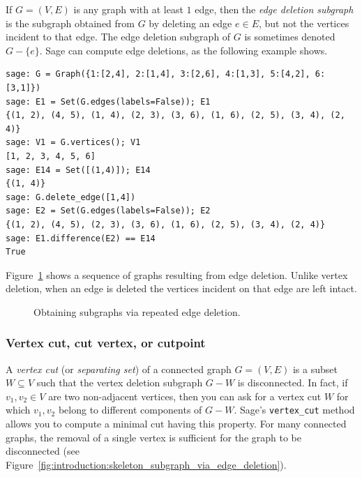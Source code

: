 If $G = (V,E)$ is any graph with at least $1$ edge, then the
\emph{edge deletion subgraph} is the subgraph obtained from $G$ by
deleting an edge $e \in E$, but not the vertices incident to that edge.
The edge deletion subgraph of $G$ is sometimes denoted $G - \{e\}$.
Sage can compute edge deletions, as the following example shows.
%
\begin{lstlisting}
sage: G = Graph({1:[2,4], 2:[1,4], 3:[2,6], 4:[1,3], 5:[4,2], 6:[3,1]})
sage: E1 = Set(G.edges(labels=False)); E1
{(1, 2), (4, 5), (1, 4), (2, 3), (3, 6), (1, 6), (2, 5), (3, 4), (2, 4)}
sage: V1 = G.vertices(); V1
[1, 2, 3, 4, 5, 6]
sage: E14 = Set([(1,4)]); E14
{(1, 4)}
sage: G.delete_edge([1,4])
sage: E2 = Set(G.edges(labels=False)); E2
{(1, 2), (4, 5), (2, 3), (3, 6), (1, 6), (2, 5), (3, 4), (2, 4)}
sage: E1.difference(E2) == E14
True
\end{lstlisting}
%
Figure~\ref{fig:introduction:edge_deletion_subgraphs} shows a sequence
of graphs resulting from edge deletion. Unlike vertex deletion, when
an edge is deleted the vertices incident on that edge are left
intact.

\begin{figure}[!htbp]
\centering

\caption{Obtaining subgraphs via repeated edge deletion.}
\label{fig:introduction:edge_deletion_subgraphs}
\end{figure}



\subsubsection{Vertex cut, cut vertex, or cutpoint}

A \emph{vertex cut} (or \emph{separating set}) of a connected graph
$G = (V, E)$ is a subset $W \subseteq V$ such that the vertex deletion
subgraph $G - W$ is disconnected. In fact, if $v_1, v_2 \in V$ are two
non-adjacent vertices, then you can ask for a vertex cut $W$ for which
$v_1, v_2$ belong to different components of $G - W$. Sage's
\verb!vertex_cut! method allows you to compute a minimal cut having
this property. For many connected graphs, the removal of a single
vertex is sufficient for the graph to be disconnected
(see Figure~\ref{fig:introduction:skeleton_subgraph_via_edge_deletion}).


